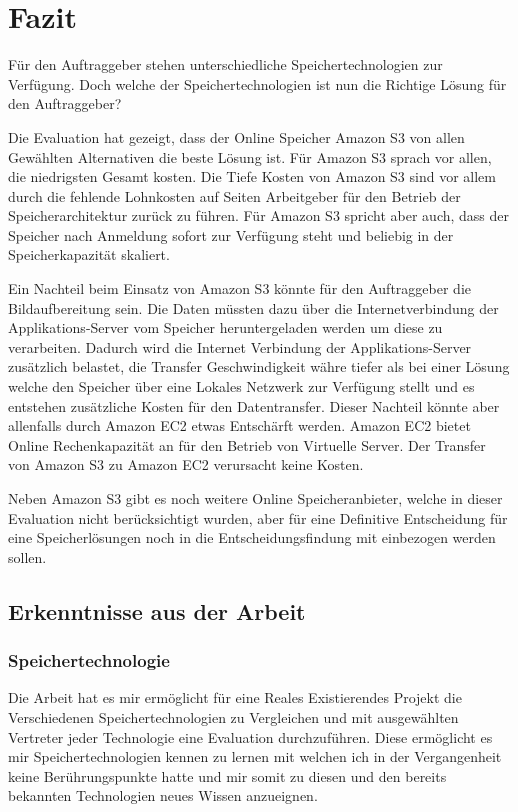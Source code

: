 \cleardoublepage
\chapter{Fazit}

Für den Auftraggeber stehen unterschiedliche Speichertechnologien zur Verfügung. Doch welche der Speichertechnologien ist nun die Richtige Lösung für den Auftraggeber?

Die Evaluation hat gezeigt, dass der Online Speicher Amazon S3 von allen Gewählten Alternativen die beste Lösung ist. Für Amazon S3 sprach vor allen, die niedrigsten Gesamt kosten. Die Tiefe Kosten von Amazon S3 sind vor allem durch die fehlende Lohnkosten auf Seiten Arbeitgeber für den Betrieb der Speicherarchitektur zurück zu führen. Für Amazon S3 spricht aber auch, dass der Speicher nach Anmeldung sofort zur Verfügung steht und beliebig in der Speicherkapazität skaliert.

Ein Nachteil beim Einsatz von Amazon S3 könnte für den Auftraggeber die Bildaufbereitung sein. Die Daten müssten dazu über die Internetverbindung der Applikations-Server vom Speicher heruntergeladen werden um diese zu verarbeiten. Dadurch wird die Internet Verbindung der Applikations-Server zusätzlich belastet, die Transfer Geschwindigkeit währe tiefer als bei einer Lösung welche den Speicher über eine Lokales Netzwerk zur Verfügung stellt und es entstehen zusätzliche Kosten für den Datentransfer. Dieser Nachteil könnte aber allenfalls durch Amazon EC2 etwas Entschärft werden. Amazon EC2 bietet Online Rechenkapazität an für den Betrieb von Virtuelle Server. Der Transfer von Amazon S3 zu Amazon EC2 verursacht keine Kosten.

Neben Amazon S3 gibt es noch weitere Online Speicheranbieter, welche in dieser Evaluation nicht berücksichtigt wurden, aber für eine Definitive Entscheidung für eine Speicherlösungen noch in die Entscheidungsfindung mit einbezogen werden sollen.



\section{Erkenntnisse aus der Arbeit}

\subsection{Speichertechnologie}
Die Arbeit hat es mir ermöglicht für eine Reales Existierendes Projekt die Verschiedenen Speichertechnologien zu Vergleichen und mit ausgewählten Vertreter jeder Technologie eine Evaluation durchzuführen. Diese ermöglicht es mir Speichertechnologien kennen zu lernen mit welchen ich in der Vergangenheit keine Berührungspunkte hatte und mir somit zu diesen und den bereits bekannten Technologien neues Wissen anzueignen.

